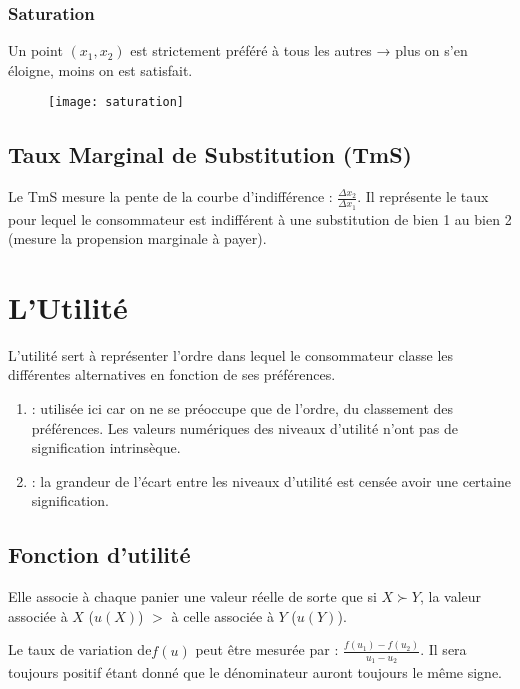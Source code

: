 \newpage
\subsubsection{Saturation}

Un point $(x_1,x_2)$ est strictement préféré à tous les autres → plus on s’en éloigne, moins on est satisfait.
\begin{figure}[H]
	\centering
	\texttt{[image: saturation]}
\end{figure}

\subsection{Taux Marginal de Substitution (TmS)}

Le TmS mesure la pente de la courbe d'indifférence : $\frac{\Delta x_2}{\Delta x_1}$. Il représente le taux pour lequel le consommateur est indifférent à une substitution de bien 1 au bien 2 (mesure la propension marginale à payer).

\section{L'Utilité}

L'utilité sert à représenter l'ordre dans lequel le consommateur classe les différentes alternatives en fonction de ses préférences.

\begin{enumerate}
\item {} : utilisée ici car on ne se préoccupe que de l'ordre, du classement des préférences. Les valeurs numériques des niveaux d'utilité n'ont pas de signification intrinsèque.
\item {} : la grandeur de l'écart entre les niveaux d'utilité est censée avoir une certaine signification.
\end{enumerate}

\subsection{Fonction d'utilité}

Elle associe à chaque panier une valeur réelle de sorte que si $X \succ Y$, la valeur associée à $X$ ($u(X)$) $>$ à celle associée à $Y$ ($u(Y)$).

Le taux de variation de$f(u)$ peut être mesurée par : $\frac{f(u_1)-f(u_2)}{u_1 - u_2}$. Il sera toujours positif étant donné que le dénominateur auront toujours le même signe.

